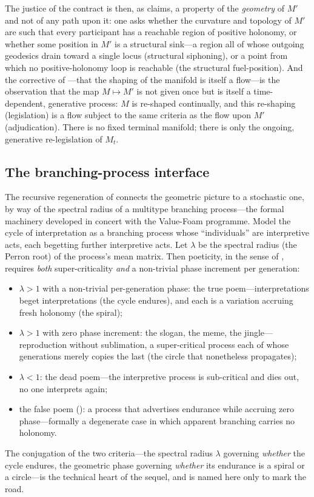 The justice of the contract is then, as  claims, a property of the \emph{geometry} of $M'$ and not of any path upon it: one asks whether the curvature and topology of $M'$ are such that every participant has a reachable region of positive holonomy, or whether some position in $M'$ is a structural sink---a region all of whose outgoing geodesics drain toward a single locus (structural siphoning), or a point from which no positive-holonomy loop is reachable (the structural fuel-position). And the corrective of ---that the shaping of the manifold is itself a flow---is the observation that the map $M \mapsto M'$ is not given once but is itself a time-dependent, generative process: $M$ is re-shaped continually, and this re-shaping (legislation) is a flow subject to the same criteria as the flow upon $M'$ (adjudication). There is no fixed terminal manifold; there is only the ongoing, generative re-legislation of $M_t$.

\subsection{The branching-process interface}
\label{p09:sec:app-branching}

The recursive regeneration of  connects the geometric picture to a stochastic one, by way of the spectral radius of a multitype branching process---the formal machinery developed in concert with the Value-Foam programme. Model the cycle of interpretation as a branching process whose ``individuals'' are interpretive acts, each begetting further interpretive acts. Let $\lambda$ be the spectral radius (the Perron root) of the process's mean matrix. Then poeticity, in the sense of , requires \emph{both} super-criticality \emph{and} a non-trivial phase increment per generation:
\begin{itemize}
\item $\lambda > 1$ with a non-trivial per-generation phase: the true poem---interpretations beget interpretations (the cycle endures), and each is a variation accruing fresh holonomy (the spiral);
\item $\lambda > 1$ with zero phase increment: the slogan, the meme, the jingle---reproduction without sublimation, a super-critical process each of whose generations merely copies the last (the circle that nonetheless propagates);
\item $\lambda < 1$: the dead poem---the interpretive process is sub-critical and dies out, no one interprets again;
\item the false poem (): a process that advertises endurance while accruing zero phase---formally a degenerate case in which apparent branching carries no holonomy.
\end{itemize}
The conjugation of the two criteria---the spectral radius $\lambda$ governing \emph{whether} the cycle endures, the geometric phase governing \emph{whether} its endurance is a spiral or a circle---is the technical heart of the sequel, and is named here only to mark the road.

